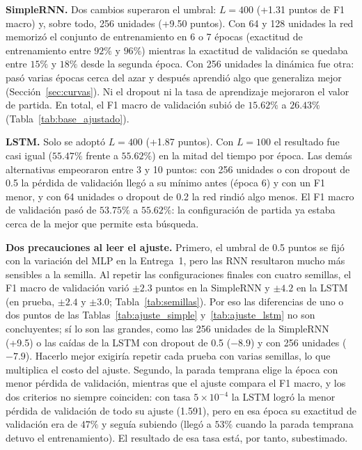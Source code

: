 \documentclass[12pt, a4paper]{article}
\newcommand{\tabla}[1]{}
\newcommand{\tablaancha}[1]{\adjustbox{max width=\linewidth}{\tabla{#1}}}
\begin{document}
\textbf{SimpleRNN.} Dos cambios superaron el umbral: $L=400$ (+1.31 puntos de F1 macro) y, sobre todo, 256 unidades (+9.50 puntos). Con 64 y 128 unidades la red memorizó el conjunto de entrenamiento en 6 o 7 épocas (exactitud de entrenamiento entre $92\%$ y $96\%$) mientras la exactitud de validación se quedaba entre $15\%$ y $18\%$ desde la segunda época. Con 256 unidades la dinámica fue otra: pasó varias épocas cerca del azar y después aprendió algo que generaliza mejor (Sección~\ref{sec:curvas}). Ni el dropout ni la tasa de aprendizaje mejoraron el valor de partida. En total, el F1 macro de validación subió de $15.62\%$ a $26.43\%$ (Tabla~\ref{tab:base_ajustado}).

\textbf{LSTM.} Solo se adoptó $L=400$ (+1.87 puntos). Con $L=100$ el resultado fue casi igual ($55.47\%$ frente a $55.62\%$) en la mitad del tiempo por época. Las demás alternativas empeoraron entre 3 y 10 puntos: con 256 unidades o con dropout de 0.5 la pérdida de validación llegó a su mínimo antes (época 6) y con un F1 menor, y con 64 unidades o dropout de 0.2 la red rindió algo menos. El F1 macro de validación pasó de $53.75\%$ a $55.62\%$: la configuración de partida ya estaba cerca de la mejor que permite esta búsqueda.

\textbf{Dos precauciones al leer el ajuste.} Primero, el umbral de 0.5 puntos se fijó con la variación del MLP en la Entrega~1, pero las RNN resultaron mucho más sensibles a la semilla. Al repetir las configuraciones finales con cuatro semillas, el F1 macro de validación varió $\pm 2.3$ puntos en la SimpleRNN y $\pm 4.2$ en la LSTM (en prueba, $\pm 2.4$ y $\pm 3.0$; Tabla~\ref{tab:semillas}). Por eso las diferencias de uno o dos puntos de las Tablas~\ref{tab:ajuste_simple} y~\ref{tab:ajuste_lstm} no son concluyentes; sí lo son las grandes, como las 256 unidades de la SimpleRNN (+9.5) o las caídas de la LSTM con dropout de 0.5 ($-8.9$) y con 256 unidades ($-7.9$). Hacerlo mejor exigiría repetir cada prueba con varias semillas, lo que multiplica el costo del ajuste. Segundo, la parada temprana elige la época con menor pérdida de validación, mientras que el ajuste compara el F1 macro, y los dos criterios no siempre coinciden: con tasa $5\times10^{-4}$ la LSTM logró la menor pérdida de validación de todo su ajuste (1.591), pero en esa época su exactitud de validación era de $47\%$ y seguía subiendo (llegó a $53\%$ cuando la parada temprana detuvo el entrenamiento). El resultado de esa tasa está, por tanto, subestimado.

\begin{table}[H]
\centering
\caption{Configuración base frente a configuración ajustada (resultados de validación).}
\label{tab:base_ajustado}
\small
\tablaancha{base_vs_ajustado}
\end{table}
\end{document}
